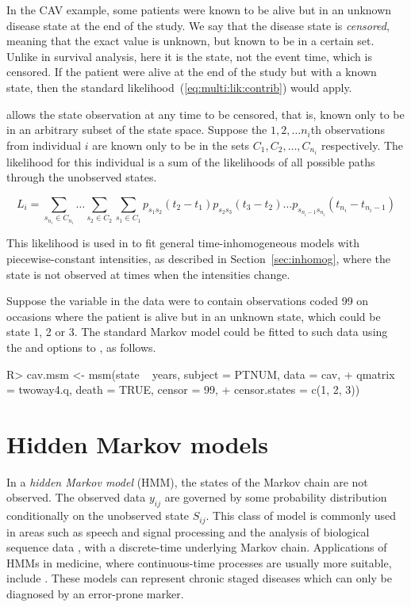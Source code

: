 \documentclass[article,shortnames]{jss}
\begin{document}
In the CAV example, some patients were known to be alive but in an
unknown disease state at the end of the study.  We say that the
disease state is \emph{censored}, meaning that the exact value is
unknown, but known to be in a certain set.  Unlike in survival
analysis, here it is the state, not the event time, which is censored.
If the patient were alive at the end of the study but with a known
state, then the standard likelihood~(\ref{eq:multi:lik:contrib}) would
apply.

 allows the state observation at any time to be censored,
that is, known only to be in an arbitrary subset of the state space.
Suppose the $1, 2, \ldots n_i$th observations from individual $i$ are
known only to be in the sets $C_1, C_2, \ldots, C_{n_i}$ respectively.
The likelihood for this individual is a sum of the likelihoods of all
possible paths through the unobserved states.

\begin{equation}
  \label{eq:cens}
  L_i = \sum_{s_{n_i} \in C_{n_i}} \ldots \sum_{s_2 \in C_2} \sum_{s_1 \in C_1} p_{s_1 s_2}(t_2 - t_1) p_{s_2 s_3} (t_3 - t_2) \ldots p_{s_{n_i-1} s_{n_i}} (t_{n_i} - t_{n_i-1})
\end{equation}

This likelihood is used in  to fit general time-inhomogeneous
models with piecewise-constant intensities, as described in
Section~\ref{sec:inhomog}, where the state is not observed at times
when the intensities change.

Suppose the variable  in the data  were to
contain observations coded 99 on occasions where the patient is alive
but in an unknown state, which could be state 1, 2 or 3.  The standard
Markov model could be fitted to such data using the  and
 options to , as follows.

\begin{CodeInput}
R> cav.msm <- msm(state ~ years, subject = PTNUM, data = cav,
+    qmatrix = twoway4.q, death = TRUE, censor = 99,
+    censor.states = c(1, 2, 3))
\end{CodeInput}



\section{Hidden Markov models}
\label{sec:hmm}

In a {\em hidden Markov model} (HMM), the states of the Markov chain
are not observed. The observed data $y_{ij}$ are governed by some
probability distribution conditionally on the unobserved state
$S_{ij}$.  This class of model is commonly used in areas such as
speech and signal processing \citep{juang:rabiner} and the analysis of
biological sequence data \citep{biolog:seq}, with a discrete-time
underlying Markov chain.  Applications of HMMs in medicine, where
continuous-time processes are usually more suitable, include
\citet{sattlong,bureau:sim,JacksonS02,jackson03:_multis_markov}.
These models can represent chronic staged diseases which can only be
diagnosed by an error-prone marker.
\end{document}
